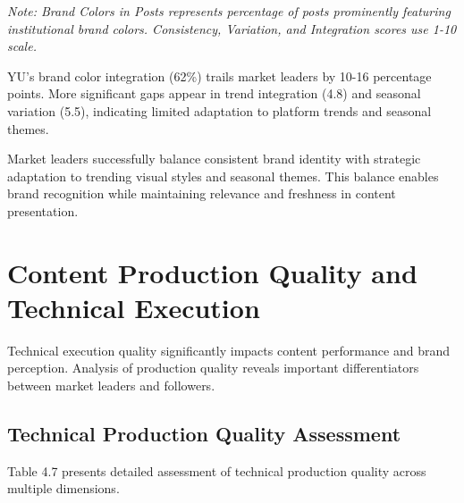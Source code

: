 \documentclass[12pt]{report}
\begin{document}
\textit{Note: Brand Colors in Posts represents percentage of posts prominently featuring institutional brand colors. Consistency, Variation, and Integration scores use 1-10 scale.}

YU's brand color integration (62\%) trails market leaders by 10-16 percentage points. More significant gaps appear in trend integration (4.8) and seasonal variation (5.5), indicating limited adaptation to platform trends and seasonal themes.

Market leaders successfully balance consistent brand identity with strategic adaptation to trending visual styles and seasonal themes. This balance enables brand recognition while maintaining relevance and freshness in content presentation.

\chapter{Content Production Quality and Technical Execution}

Technical execution quality significantly impacts content performance and brand perception. Analysis of production quality reveals important differentiators between market leaders and followers.

\section{Technical Production Quality Assessment}

Table 4.7 presents detailed assessment of technical production quality across multiple dimensions.
\end{document}
